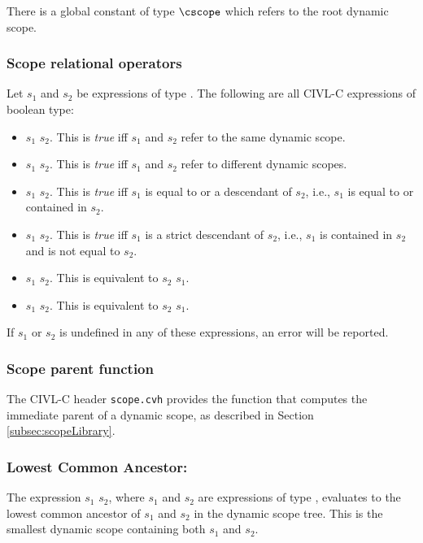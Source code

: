 There is a global constant \cscoperoot{} of type $\cscope$ which
refers to the root dynamic scope.


\subsubsection{Scope relational operators}

Let $s_1$ and $s_2$ be expressions of type \cscope.  The following are
all CIVL-C expressions of boolean type:
\begin{itemize}
\item $s_1$ \ct{==} $s_2$.  This is \emph{true} iff $s_1$ and $s_2$
  refer to the same dynamic scope.
\item  $s_1$ \ct{!=} $s_2$.  This is \emph{true} iff $s_1$ and $s_2$
  refer to different dynamic scopes.
\item  $s_1$ \ct{<=} $s_2$.  This is \emph{true} iff $s_1$ is equal to
  or a descendant of $s_2$, i.e., $s_1$ is equal to or contained in $s_2$.
\item  $s_1$ \ct{<} $s_2$.  This is \emph{true} iff $s_1$ is a strict 
  descendant of $s_2$, i.e., $s_1$ is contained in $s_2$ and is not
  equal to $s_2$.
\item $s_1$ \ct{>} $s_2$.  This is equivalent to $s_2$ \ct{<} $s_1$.
\item  $s_1$ \ct{>=} $s_2$.  This is equivalent to $s_2$ \ct{<=} $s_1$.
\end{itemize}
If $s_1$ or $s_2$ is undefined in any of these expressions, an error
will be reported.

\subsubsection{Scope parent function \texorpdfstring{\cscopeparent}{\$scope\_parent}}

The CIVL-C header \texttt{scope.cvh} provides the function \cscopeparent{} that computes the immediate
parent of a dynamic scope, as described in Section \ref{subsec:scopeLibrary}.

\subsubsection{Lowest Common Ancestor: \ct{+}}

The expression $s_1$ \ct{+} $s_2$, where $s_1$ and $s_2$ are
expressions of type \cscope, evaluates to the lowest common ancestor
of $s_1$ and $s_2$ in the dynamic scope tree. This is the smallest
dynamic scope containing both $s_1$ and $s_2$.

